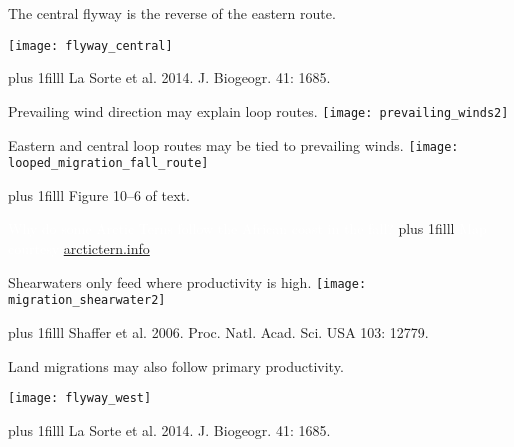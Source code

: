 \documentclass[t]{beamer}
\newcommand\imagecredit[1]{%
	\vskip0pt plus 1filll \tiny #1}%
\begin{document}
{
\begin{frame}[t,plain]{The central flyway is the reverse of the eastern route.}
	\begin{center}
		\texttt{[image: flyway\_central]}
	\end{center}
		
	\imagecredit{\hfill La Sorte et al. 2014. J. Biogeogr. 41: 1685.}
\end{frame}
}

{
\begin{frame}[t,plain]{Prevailing wind direction may explain loop routes.}
	\centering
		\texttt{[image: prevailing\_winds2]}
\end{frame}
}

{
\begin{frame}[t,plain]{Eastern and central loop routes may be tied to prevailing winds.}
	\centering
		\texttt{[image: looped\_migration\_fall\_route]}

	\imagecredit{\hfill Figure 10–6 of text.}
\end{frame}
}

{
\begin{frame}[t,plain]{\textcolor{white}{Why do some Arctic Terns follow the African coast in the fall?}}
	\imagecredit{\hfill\textcolor{white}{ Map courtesy \url{arctictern.info}}}
\end{frame}
}


{
\begin{frame}[t,plain]{Shearwaters only feed where productivity is high.}
	\vspace{0.5cm}
	\centering
		\texttt{[image: migration\_shearwater2]}

	\imagecredit{Shaffer et al. 2006. Proc. Natl. Acad. Sci. USA 103: 12779.\hfill}
\end{frame}
}


{
\begin{frame}[t,plain]{Land migrations may also follow primary productivity.}
	\begin{center}
		\texttt{[image: flyway\_west]}
	\end{center}


	\imagecredit{\hfill La Sorte et al. 2014. J. Biogeogr. 41: 1685.}
\end{frame}
}
\end{document}
